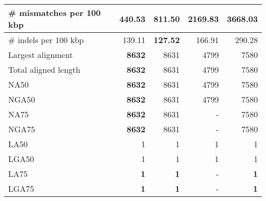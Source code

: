 \documentclass[12pt,a4paper]{article}
\begin{document}
\begin{table}[ht]
\begin{center}
\begin{tabular}{|l*{4}{|r}|}
\# mismatches per 100 kbp & {\bf 440.53} & 811.50 & 2169.83 & 3668.03 \\ \hline
\# indels per 100 kbp & 139.11 & {\bf 127.52} & 166.91 & 290.28 \\ \hline
Largest alignment & {\bf 8632} & 8631 & 4799 & 7580 \\ \hline
Total aligned length & {\bf 8632} & 8631 & 4799 & 7580 \\ \hline
NA50 & {\bf 8632} & 8631 & 4799 & 7580 \\ \hline
NGA50 & {\bf 8632} & 8631 & 4799 & 7580 \\ \hline
NA75 & {\bf 8632} & 8631 & - & 7580 \\ \hline
NGA75 & {\bf 8632} & 8631 & - & 7580 \\ \hline
LA50 & 1 & 1 & 1 & 1 \\ \hline
LGA50 & 1 & 1 & 1 & 1 \\ \hline
LA75 & {\bf 1} & {\bf 1} & - & {\bf 1} \\ \hline
LGA75 & {\bf 1} & {\bf 1} & - & {\bf 1} \\ \hline
\end{tabular}
\end{center}
\end{table}
\end{document}
